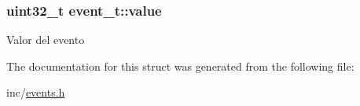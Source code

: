 \subsubsection[{\texorpdfstring{value}{value}}]{\setlength{\rightskip}{0pt plus 5cm}uint32\+\_\+t event\+\_\+t\+::value}\hypertarget{structevent__t_a707f7b4d3943795acae6a231ff3192bd}{}\label{structevent__t_a707f7b4d3943795acae6a231ff3192bd}
Valor del evento 

The documentation for this struct was generated from the following file\+:\begin{DoxyCompactItemize}
\item 
inc/\hyperlink{events_8h}{events.\+h}\end{DoxyCompactItemize}
